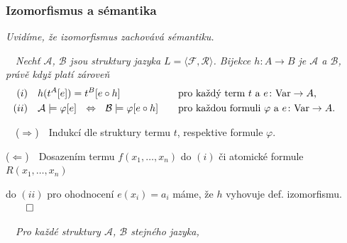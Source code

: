     \smallskip
    
    \smallskip
    
    
    
    
    \subsubsection*{Izomorfismus a sémantika}
    {\it Uvidíme, že izomorfismus zachovává sémantiku.}
    \medskip
    
    {\bf {}}\ \ {\it Nechť $\mathcal{A}$, $\mathcal{B}$ jsou struktury jazyka $L=\langle\mathcal{F},\mathcal{R}\rangle$.
    \smallskip
    Bijekce $h\colon A\to B$ je  $\mathcal{A}$ a $\mathcal{B}$, právě když platí zároveň
    \vspace{-1mm}
    \begin{align*}{(i)}\quad&{h(t^A[e])=t^B[e\circ h]}& &\text{pro každý term $t$ a $e\colon \mathrm{Var} \to A$, }\\
    {(ii)}\quad&{\mathcal{A}\models \varphi[e]\ \ \Leftrightarrow\ \ \mathcal{B}\models \varphi[e\circ h]}&\quad &\text{pro každou formuli $\varphi$ a $e\colon \mathrm{Var} \to A$.}\qquad
    \end{align*}}
    
    {\it {}}\ \ ($\Rightarrow$)\ \ Indukcí dle struktury termu $t$, respektive formule $\varphi$.
    \smallskip
    
    ($\Leftarrow$)\ \ Dosazením termu $f(x_1,\dots,x_n)$ do $(i)$ či atomické formule $R(x_1,\dots,x_n)$
    \smallskip
    
    do $(ii)$ pro ohodnocení $e(x_i)=a_i$ máme, že $h$ vyhovuje def. izomorfismu.$\qed$
    \bigskip
    
    {\bf {}}\ \ {\it Pro každé struktury $\mathcal{A}$, $\mathcal{B}$ stejného jazyka,}
    \vspace{-2mm}
    
